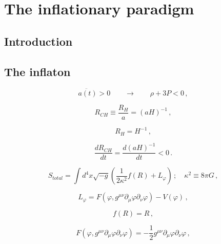 \chapter{The inflationary paradigm}
\label{chapter:2}

\section{Introduction}
\label{section:2.1}

\section{The inflaton}
\label{section:2.2}

\begin{equation}
\ddot{a(t)}>0 \qquad \rightarrow \qquad \rho + 3 P < 0 \, ,
\label{equation:2.2.1}
\end{equation}

\begin{equation}
R_{CH} \equiv \frac{R_H}{a} = (aH)^{-1} \, ,
\label{equation:2.2.2} 
\end{equation} 

\begin{equation}
R_H = H^{-1} \, ,
\label{equation:2.2.3}
\end{equation}
 
\begin{equation}
\dfrac{dR_{CH}}{dt} = \dfrac{d (aH)^{-1}}{dt} < 0 \, .
\label{equation:2.2.4}
\end{equation}

\begin{equation}
S_{total} = \int d^4 x \sqrt{-g} \left( \frac{1}{2 \kappa^2} f(R) + L_{\varphi} \right) \, ; \quad \kappa^2 \equiv 8\pi G\, ,
\label{equation:2.2.5}
\end{equation}

\begin{equation}
L_{\varphi} = F(\varphi , g^{\mu\nu}\partial_{\mu} \varphi \partial_{\nu} \varphi) - V(\varphi) \, ,
\label{equation:2.2.6}
\end{equation}

\begin{equation}
f(R)=R \, ,
\label{equation:2.2.7}
\end{equation}

\begin{equation}
F(\varphi , g^{\mu\nu}\partial_{\mu} \varphi \partial_{\nu} \varphi)=-\frac{1}{2} g^{\mu \nu} \partial_{\mu} \varphi \partial_{\nu} \varphi \, ,
\label{equation:2.2.8}
\end{equation}

